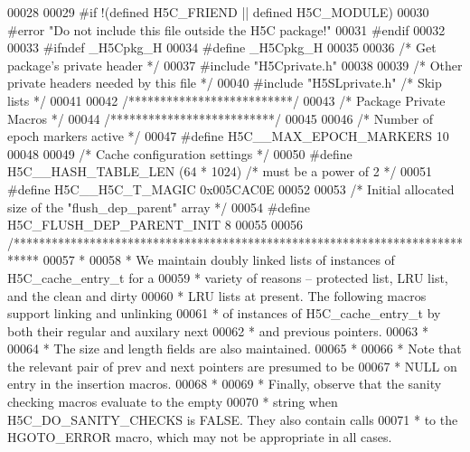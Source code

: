 \begin{DoxyCode}
00028 
00029 \textcolor{preprocessor}{#if !(defined H5C\_FRIEND || defined H5C\_MODULE)}
00030 \textcolor{preprocessor}{#error "Do not include this file outside the H5C package!"}
00031 \textcolor{preprocessor}{#endif}
00032 
00033 \textcolor{preprocessor}{#ifndef \_H5Cpkg\_H}
00034 \textcolor{preprocessor}{#define \_H5Cpkg\_H}
00035 
00036 \textcolor{comment}{/* Get package's private header */}
00037 \textcolor{preprocessor}{#include "H5Cprivate.h"}
00038 
00039 \textcolor{comment}{/* Other private headers needed by this file */}
00040 \textcolor{preprocessor}{#include "H5SLprivate.h"}        \textcolor{comment}{/* Skip lists */}
00041 
00042 \textcolor{comment}{/**************************/}
00043 \textcolor{comment}{/* Package Private Macros */}
00044 \textcolor{comment}{/**************************/}
00045 
00046 \textcolor{comment}{/* Number of epoch markers active */}
00047 \textcolor{preprocessor}{#define H5C\_\_MAX\_EPOCH\_MARKERS                  10}
00048 
00049 \textcolor{comment}{/* Cache configuration settings */}
00050 \textcolor{preprocessor}{#define H5C\_\_HASH\_TABLE\_LEN     (64 * 1024) }\textcolor{comment}{/* must be a power of 2 */}\textcolor{preprocessor}{}
00051 \textcolor{preprocessor}{#define H5C\_\_H5C\_T\_MAGIC    0x005CAC0E}
00052 
00053 \textcolor{comment}{/* Initial allocated size of the "flush\_dep\_parent" array */}
00054 \textcolor{preprocessor}{#define H5C\_FLUSH\_DEP\_PARENT\_INIT 8}
00055 
00056 \textcolor{comment}{/****************************************************************************}
00057 \textcolor{comment}{ *}
00058 \textcolor{comment}{ * We maintain doubly linked lists of instances of H5C\_cache\_entry\_t for a}
00059 \textcolor{comment}{ * variety of reasons -- protected list, LRU list, and the clean and dirty}
00060 \textcolor{comment}{ * LRU lists at present.  The following macros support linking and unlinking}
00061 \textcolor{comment}{ * of instances of H5C\_cache\_entry\_t by both their regular and auxilary next}
00062 \textcolor{comment}{ * and previous pointers.}
00063 \textcolor{comment}{ *}
00064 \textcolor{comment}{ * The size and length fields are also maintained.}
00065 \textcolor{comment}{ *}
00066 \textcolor{comment}{ * Note that the relevant pair of prev and next pointers are presumed to be}
00067 \textcolor{comment}{ * NULL on entry in the insertion macros.}
00068 \textcolor{comment}{ *}
00069 \textcolor{comment}{ * Finally, observe that the sanity checking macros evaluate to the empty}
00070 \textcolor{comment}{ * string when H5C\_DO\_SANITY\_CHECKS is FALSE.  They also contain calls}
00071 \textcolor{comment}{ * to the HGOTO\_ERROR macro, which may not be appropriate in all cases.}

\end{DoxyCode}
